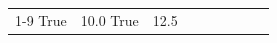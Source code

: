 \begin{table}[H]
\begin{tabular}{lllrlllll}
\cline{1-9}
True & 10.0%
\cline{1-9}
True & 12.5%

\end{tabular}
\end{table}
